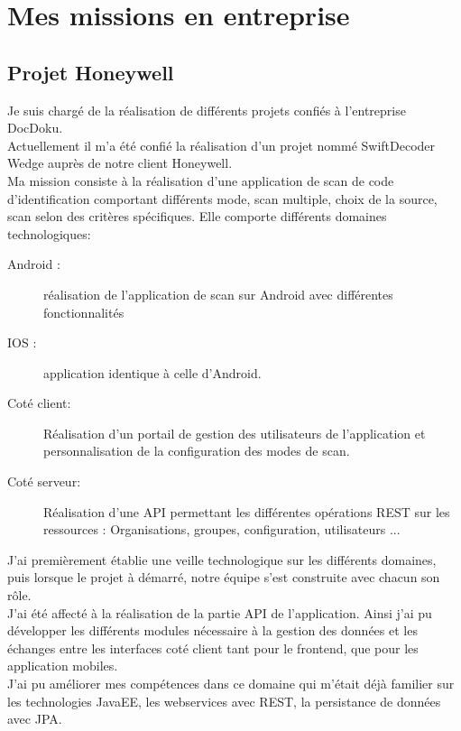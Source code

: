 \documentclass[11pt]{report}
\begin{document}
	\chapter{Mes missions en entreprise}

		\section{Projet Honeywell}

			Je suis chargé de la réalisation de différents projets confiés à l'entreprise DocDoku.\\

			Actuellement il m'a été confié la réalisation d'un projet nommé SwiftDecoder Wedge auprès de notre client Honeywell.\\

			Ma mission consiste à la réalisation d'une application de scan de code d'identification comportant différents mode, scan multiple, choix de la source, scan selon des critères spécifiques.
			Elle comporte différents domaines technologiques:

			\begin{description}
				\item[Android :] réalisation de l'application de scan sur Android avec différentes fonctionnalités
				\item[IOS :] application identique à celle d'Android.
				\item[Coté client:] Réalisation d'un portail de gestion des utilisateurs de l'application et personnalisation de la configuration des modes de scan.
				\item[Coté serveur:] Réalisation d'une API permettant les différentes opérations REST sur les ressources : Organisations, groupes, configuration, utilisateurs ...
			\end{description}

			J'ai premièrement établie une veille technologique sur les différents domaines, puis lorsque le projet à démarré, notre équipe s'est construite avec chacun son rôle.\\

			J'ai été affecté à la réalisation de la partie API de l'application. Ainsi j'ai pu développer les différents modules nécessaire à la gestion des données et les échanges entre les interfaces coté client tant pour le frontend, que pour les application mobiles.\\

			J'ai pu améliorer mes compétences dans ce domaine qui m'était déjà familier sur les technologies JavaEE, les webservices avec REST, la persistance de données avec JPA.
\end{document}
